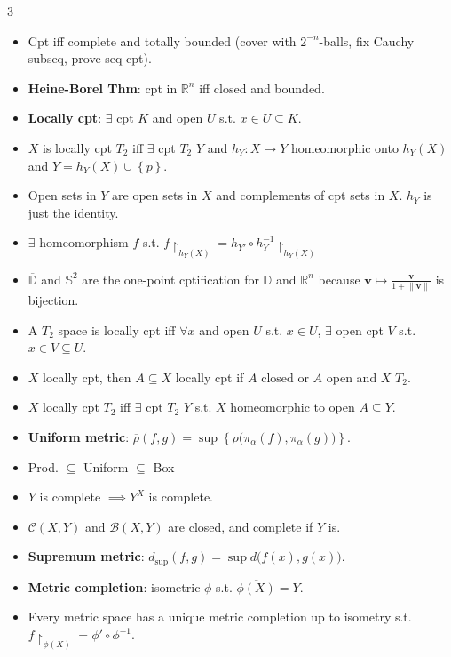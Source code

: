 \documentclass[10pt]{article}
\newcommand{\R}{\mathbb{R}} %
\newcommand{\norm}[1]{\left\lVert#1\right\rVert} %
\begin{document}
\begin{multicols*}{3}
\begin{itemize}
            \item Cpt iff complete and totally bounded (cover with $2^{-n}$-balls, fix Cauchy subseq, prove seq cpt).
            \item \textbf{Heine-Borel Thm}: cpt in $\R^n$ iff closed and bounded.
            \item \textbf{Locally cpt}: $\exists$ cpt $K$ and open $U$ s.t. $x \in U \subseteq K$.
            \item $X$ is locally cpt $T_2$ iff $\exists$ cpt $T_2$ $Y$ and $h_Y \colon X \to Y$ homeomorphic onto $h_Y\left(X\right)$ and $Y = h_Y\left(X\right) \cup \left\{p\right\}$.
            \item Open sets in $Y$ are open sets in $X$ and complements of cpt sets in $X$. $h_Y$ is just the identity.
            \item $\exists$ homeomorphism $f$ s.t. $f\restriction_{h_Y\left(X\right)} = h_{Y'} \circ h_{Y}^{-1}\restriction_{h_Y\left(X\right)}$
            \item $\overline{\mathbb{D}}$ and $\mathbb{S}^2$ are the one-point cptification for $\mathbb{D}$ and $\R^n$ because $\bm{v} \mapsto \frac{\bm{v}}{1 + \norm{\bm{v}}}$ is bijection.
            \item A $T_2$ space is locally cpt iff $\forall x$ and open $U$ s.t. $x \in U$, $\exists$ open cpt $V$ s.t. $x \in V \subseteq U$.
            \item $X$ locally cpt, then $A \subseteq X$ locally cpt if $A$ closed or $A$ open and $X$ $T_2$.
            \item $X$ locally cpt $T_2$ iff $\exists$ cpt $T_2$ $Y$ s.t. $X$ homeomorphic to open $A \subseteq Y$.
            \item \textbf{Uniform metric}: $\overline{\rho}\left(f, g\right) = \sup\left\{\rho\bigl(\pi_{\alpha}\left(f\right), \pi_{\alpha}\left(g\right)\bigr)\right\}$.
            \item Prod. $\subseteq$ Uniform $\subseteq$ Box
            \item $Y$ is complete $\implies Y^X$ is complete.
            \item $\mathcal{C}\left(X, Y\right)$ and $\mathcal{B}\left(X, Y\right)$ are closed, and complete if $Y$ is.
            \item \textbf{Supremum metric}: $d_{\sup}\left(f, g\right) = \sup d\bigl(f\left(x\right), g\left(x\right)\bigr)$.
            \item \textbf{Metric completion}: isometric $\phi$ s.t. $\overline{\phi\left(X\right)} = Y$.
            \item Every metric space has a unique metric completion up to isometry s.t. $f\restriction_{\phi\left(X\right)} = \phi' \circ \phi^{-1}$.

\end{itemize}
\end{multicols*}
\end{document}
